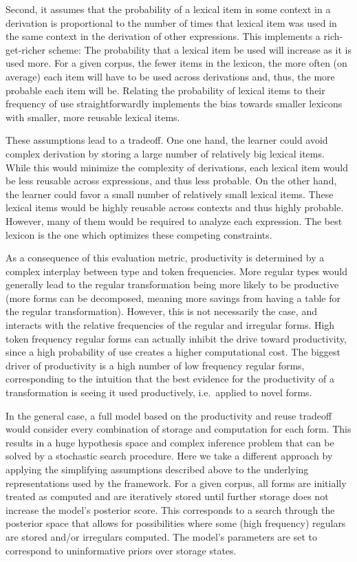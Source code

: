 \documentclass[
   11pt,
       ]{book}
\begin{document}
Second, it assumes that the probability of a lexical item in some context in a
derivation is proportional to the number of times that lexical item was used in
the same context in the derivation of other expressions. This implements a
rich-get-richer scheme: The probability that a lexical item be used will
increase as it is used more. For a given corpus, the fewer items in the lexicon,
the more often (on average) each item will have to be used across derivations
and, thus, the more probable each item will be. Relating the probability of
lexical items to their frequency of use straightforwardly implements the bias
towards smaller lexicons with smaller, more reusable lexical items.

These assumptions lead to a tradeoff. One one hand, the learner could avoid
complex derivation by storing a large number of relatively big lexical items.
While this would minimize the complexity of derivations, each lexical item would
be less reusable across expressions, and thus less probable. On the other hand,
the learner could favor a small number of relatively small lexical items. These
lexical items would be highly reusable across contexts and thus highly probable.
However, many of them would be required to analyze each expression. The best
lexicon is the one which optimizes these competing constraints.

As a consequence of this evaluation metric, productivity is determined by a
complex interplay between type and token frequencies. More regular types would
generally lead to the regular transformation being more likely to be productive
(more forms can be decomposed, meaning more savings from having a table for the
regular transformation). However, this is not necessarily the case, and
interacts with the relative frequencies of the regular and irregular forms. High
token frequency regular forms can actually inhibit the drive toward
productivity, since a high probability of use creates a higher computational
cost. The biggest driver of productivity is a high number of low frequency
regular forms, corresponding to the intuition that the best evidence for the
productivity of a transformation is seeing it used productively, i.e.~applied to
novel forms.

In the general case, a full model based on the productivity and reuse tradeoff
would consider every combination of storage and computation for each form. This
results in a huge hypothesis space and complex inference problem that can be
solved by a stochastic search procedure. Here we take a different approach by
applying the simplifying assumptions described above to the underlying
representations used by the framework. For a given corpus, all forms are
initially treated as computed and are iteratively stored until further storage
does not increase the model's posterior score. This corresponds to a search
through the posterior space that allows for possibilities where some (high
frequency) regulars are stored and/or irregulars computed. The model's
parameters are set to correspond to uninformative priors over storage states.
\end{document}
